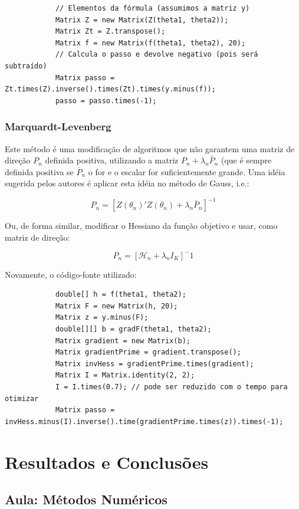 \documentclass{abnt}
\newenvironment{mylisting}
{\begin{list}{}{\setlength{\leftmargin}{1em}}\item\scriptsize\bfseries}
{\end{list}}
\begin{document}
\begin{mylisting}
\begin{verbatim}
			// Elementos da fórmula (assumimos a matriz y)
			Matrix Z = new Matrix(Z(theta1, theta2));
			Matrix Zt = Z.transpose();
			Matrix f = new Matrix(f(theta1, theta2), 20);
			// Calcula o passo e devolve negativo (pois será subtraído)
			Matrix passo = Zt.times(Z).inverse().times(Zt).times(y.minus(f));
			passo = passo.times(-1);
\end{verbatim}
\end{mylisting}

\subsection{Marquardt-Levenberg}

Este método é uma modificação de algoritmos que não garantem uma matriz de direção $P_n$ definida positiva, utilizando a matriz $P_n + \lambda_n\bar P_n$ (que é sempre definida positiva se $\bar P_n$ o for e o escalar for suficientemente grande. Uma idéia sugerida pelos autores é aplicar esta idéia no método de Gauss, i.e.:

\[ P_n = [Z(\theta_n)'Z(\theta_n) + \lambda_n\bar P_n]^{-1} \]

Ou, de forma similar, modificar o Hessiano da função objetivo e usar, como matriz de direção:

\[ P_n = [\mathcal{H}_n+\lambda_nI_K]^-1 \]

Novamente, o código-fonte utilizado:

\begin{mylisting}
\begin{verbatim}
			double[] h = f(theta1, theta2);
			Matrix F = new Matrix(h, 20);
			Matrix z = y.minus(F);
			double[][] b = gradF(theta1, theta2);
			Matrix gradient = new Matrix(b);
			Matrix gradientPrime = gradient.transpose();
			Matrix invHess = gradientPrime.times(gradient);
			Matrix I = Matrix.identity(2, 2);
			I = I.times(0.7); // pode ser reduzido com o tempo para otimizar
			Matrix passo = invHess.minus(I).inverse().time(gradientPrime.times(z)).times(-1);
\end{verbatim}
\end{mylisting}


\chapter {Resultados e Conclusões}

\section{Aula: Métodos Numéricos}
\end{document}
